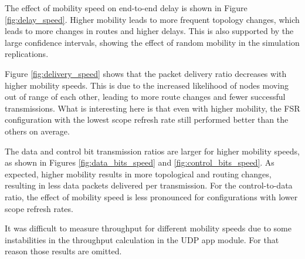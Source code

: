 \documentclass{winslabreport}
\begin{document}
The effect of mobility speed on end-to-end delay is shown in Figure \ref{fig:delay_speed}. Higher mobility leads to more frequent topology changes, which leads to more changes in routes and higher delays. This is also supported by the large confidence intervals, showing the effect of random mobility in the simulation replications.

Figure \ref{fig:delivery_speed} shows that the packet delivery ratio decreases with higher mobility speeds. This is due to the increased likelihood of nodes moving out of range of each other, leading to more route changes and fewer successful transmissions. What is interesting here is that even with higher mobility, the FSR configuration with the lowest scope refresh rate still performed better than the others on average. 

The data and control bit transmission ratios are larger for higher mobility speeds, as shown in Figures \ref{fig:data_bits_speed} and \ref{fig:control_bits_speed}. As expected, higher mobility results in more topological and routing changes, resulting in less data packets delivered per transmission. For the control-to-data ratio, the effect of mobility speed is less pronounced for configurations with lower scope refresh rates.

It was difficult to measure throughput for different mobility speeds due to some instabilities in the throughput calculation in the UDP app module. For that reason those results are omitted.
\end{document}
